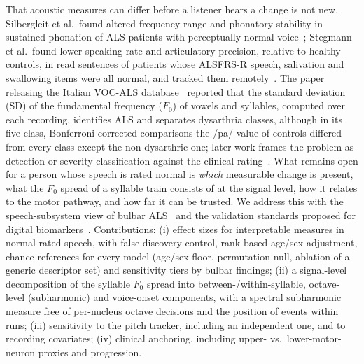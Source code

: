 \documentclass{article}
\begin{document}
That acoustic measures can differ before a listener hears a change is not new. Silbergleit et al.\ found altered frequency range and phonatory stability in sustained phonation of ALS patients with perceptually normal voice~\cite{silbergleit1997}; Stegmann et al.\ found lower speaking rate and articulatory precision, relative to healthy controls, in read sentences of patients whose ALSFRS-R speech, salivation and swallowing items were all normal, and tracked them remotely~\cite{stegmann2020early}. The paper releasing the Italian VOC-ALS database~\cite{dubbioso2024vocals} reported that the standard deviation (SD) of the fundamental frequency ($F_0$) of vowels and syllables, computed over each recording, identifies ALS and separates dysarthria classes, although in its five-class, Bonferroni-corrected comparisons the /pa/ value of controls differed from every class except the non-dysarthric one; later work frames the problem as detection or severity classification against the clinical rating~\cite{dubbioso2024precision,vashkevich2021,tena2021}. What remains open for a person whose speech is rated normal is \emph{which} measurable change is present, what the $F_0$ spread of a syllable train consists of at the signal level, how it relates to the motor pathway, and how far it can be trusted. We address this with the speech-subsystem view of bulbar ALS~\cite{rong2015subsystem,kent2003typology} and the validation standards proposed for digital biomarkers~\cite{goldsack2020v3,rusz2021biomarkers}. Contributions: (i) effect sizes for \nFeat{} interpretable measures in normal-rated speech, with false-discovery control, rank-based age/sex adjustment, chance references for every model (age/sex floor, permutation null, ablation of a generic descriptor set) and sensitivity tiers by bulbar findings; (ii) a signal-level decomposition of the syllable $F_0$ spread into between-/within-syllable, octave-level (subharmonic) and voice-onset components, with a spectral subharmonic measure free of per-nucleus octave decisions and the position of events within runs; (iii) sensitivity to the pitch tracker, including an independent one, and to recording covariates; (iv) clinical anchoring, including upper- vs.\ lower-motor-neuron proxies and progression.
\end{document}
